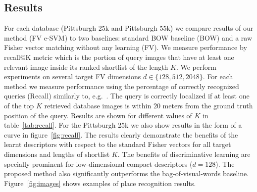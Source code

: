 \documentclass[table]{article} %
\begin{document}
		
%



	\subsection{Results}		
		For each database (Pittsburgh 25k and Pittsburgh 55k) we compare results of our method (FV e-SVM) to two baselines: standard BOW baseline (BOW) and a raw Fisher vector matching without any learning (FV). We measure performance by recall@K metric which is the portion of query images that have at least one relevant image inside its ranked shortlist of the length $K$. We perform experiments on several target FV dimensions $d\in\{128,512,2048\}$. For each method we measure performance using the percentage of correctly recognized queries (Recall) similarly to, e.g.~\cite{Chen11,Knopp2010,Sattler-BMVC12}. The query is correctly localized if at least one of the top $K$ retrieved database images is within $20$ meters from the ground truth position of the query. Results are shown for different values of $K$ in table~\ref{tab:recall}. For the Pittsburgh 25k we also show results in the form of a curve in figure~\ref{fig:recall}. 
		The results clearly demonstrate the benefits of the learnt descriptors with respect to the standard Fisher vectors for all target dimensions and lengths of shortlist $K$. The benefits of discriminative learning are specially prominent for low-dimensional compact descriptors ($d=128$). 
		 The proposed method also significantly outperforms the bag-of-visual-words baseline. 
		 Figure~\ref{fig:images} shows examples of place recognition results.	
		 
\end{document}
